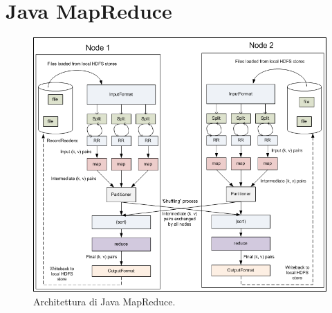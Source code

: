 \documentclass[11pt]{article} %
\begin{document}
\section{Java MapReduce}

\begin{figure}[!ht]
  \caption{Architettura di Java MapReduce.}
  \centering
    \includegraphics[scale=0.6]{hadoop_mapreduce.png}
\end{figure}
\end{document}
